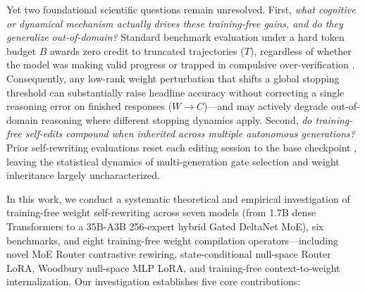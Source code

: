 \documentclass[10pt]{article}
\begin{document}
Yet two foundational scientific questions remain unresolved. First, \emph{what cognitive or dynamical mechanism actually drives these training-free gains, and do they generalize out-of-domain?} Standard benchmark evaluation under a hard token budget $B$ awards zero credit to truncated trajectories ($T$), regardless of whether the model was making valid progress or trapped in compulsive over-verification \citep{chen2025overthinking,pipis2026loop,kaiser2026beyond,nie2026coupling}. Consequently, any low-rank weight perturbation that shifts a global stopping threshold can substantially raise headline accuracy without correcting a single reasoning error on finished responses ($W \to C$)---and may actively degrade out-of-domain reasoning where different stopping dynamics apply. Second, \emph{do training-free self-edits compound when inherited across multiple autonomous generations?} Prior self-rewriting evaluations reset each editing session to the base checkpoint \citep{fan2026selfrewriting}, leaving the statistical dynamics of multi-generation gate selection and weight inheritance largely uncharacterized.

In this work, we conduct a systematic theoretical and empirical investigation of training-free weight self-rewriting across seven models (from 1.7B dense Transformers to a 35B-A3B 256-expert hybrid Gated DeltaNet MoE), six benchmarks, and eight training-free weight compilation operators---including novel MoE Router contrastive rewiring, state-conditional null-space Router LoRA, Woodbury null-space MLP LoRA, and training-free context-to-weight internalization. Our investigation establishes five core contributions:
\end{document}
